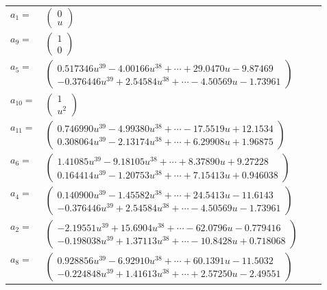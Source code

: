 \documentclass[1p]{elsarticle_modified}
\theoremstyle{definition}
\begin{document}
\begin{tabular}{m{7pt} m{180pt} m{7pt} m{180pt} }
\flushright $a_{1}=$&$\begin{pmatrix}0\\u\end{pmatrix}$ \\
\flushright $a_{9}=$&$\begin{pmatrix}1\\0\end{pmatrix}$ \\
\flushright $a_{5}=$&$\begin{pmatrix}0.517346 u^{39}-4.00166 u^{38}+\cdots+29.0470 u-9.87469\\-0.376446 u^{39}+2.54584 u^{38}+\cdots-4.50569 u-1.73961\end{pmatrix}$ \\
\flushright $a_{10}=$&$\begin{pmatrix}1\\u^2\end{pmatrix}$ \\
\flushright $a_{11}=$&$\begin{pmatrix}0.746990 u^{39}-4.99380 u^{38}+\cdots-17.5519 u+12.1534\\0.308064 u^{39}-2.13174 u^{38}+\cdots+6.29908 u+1.96875\end{pmatrix}$ \\
\flushright $a_{6}=$&$\begin{pmatrix}1.41085 u^{39}-9.18105 u^{38}+\cdots+8.37890 u+9.27228\\0.164414 u^{39}-1.20753 u^{38}+\cdots+7.15413 u+0.946038\end{pmatrix}$ \\
\flushright $a_{4}=$&$\begin{pmatrix}0.140900 u^{39}-1.45582 u^{38}+\cdots+24.5413 u-11.6143\\-0.376446 u^{39}+2.54584 u^{38}+\cdots-4.50569 u-1.73961\end{pmatrix}$ \\
\flushright $a_{2}=$&$\begin{pmatrix}-2.19551 u^{39}+15.6904 u^{38}+\cdots-62.0796 u-0.779416\\-0.198038 u^{39}+1.37113 u^{38}+\cdots-10.8428 u+0.718068\end{pmatrix}$ \\
\flushright $a_{8}=$&$\begin{pmatrix}0.928856 u^{39}-6.92910 u^{38}+\cdots+60.1391 u-11.5032\\-0.224848 u^{39}+1.41613 u^{38}+\cdots+2.57250 u-2.49551\end{pmatrix}$ \\

\end{tabular}
\end{document}
